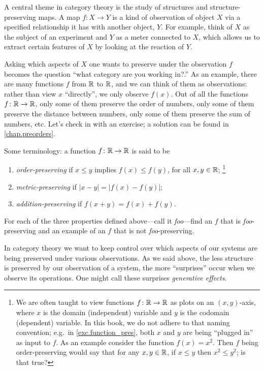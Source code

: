 \documentclass[7Sketches]{subfiles}
\begin{document}
A central theme in category theory is the study of structures and
structure-preserving maps.%
 A map $f\colon X\to Y$ is a kind of observation of object $X$ via a specified relationship it has with another object, $Y$. For example, think of $X$ as the subject of an experiment and $Y$ as a meter connected to $X$, which allows us to extract certain features of $X$ by looking at the reaction of $Y$.

Asking which aspects of $X$ one wants
to preserve under the observation $f$ becomes the question ``what category are you working
in?.'' As an example, there are many functions $f$ from $\mathbb{R}$ to $\mathbb{R}$, and we can think of them as observations: rather than view $x$ ``directly'', we only observe $f(x)$. Out of all the functions $f\colon\mathbb{R}\to\mathbb{R}$, only
some of them preserve the order of numbers, only some of them preserve the distance between numbers, only
some of them preserve the sum of numbers, etc. Let's check in with an exercise; a solution can be found in \cref{chap.preorders}.

\begin{exercise}%
\label{exc.function_pres} %
%
Some terminology: a function $f\colon \mathbb{R}\to\mathbb{R}$ is said to be
\begin{enumerate}[label=(\alph*)]
	\item \emph{order-preserving} if $x\leq y$ implies $f(x)\leq f(y)$, for all $x,y\in\mathbb{R}$;%
	\footnote{We are often taught to view functions $f\colon\mathbb{R}\to\mathbb{R}$ as plots on an $(x,y)$-axis, where $x$ is the domain (independent) variable and $y$ is the codomain (dependent) variable. In this book, we do not adhere to that naming convention; e.g.\ in \cref{exc.function_pres}, both $x$ and $y$ are being ``plugged in'' as input to $f$. As an example consider the function $f(x)=x^2$. Then $f$ being order-preserving would say that for any $x,y\in\mathbb{R}$, if $x\leq y$ then $x^2\leq y^2$; is that true?}
	\item \emph{metric-preserving} if $|x-y|=|f(x)-f(y)|$;
	\item \emph{addition-preserving} if $f(x+y)=f(x)+f(y)$.
\end{enumerate}
For each of the three properties defined above---call it \emph{foo}---find an $f$ that is \emph{foo}-preserving and
an example of an $f$ that is not \emph{foo}-preserving.
\end{exercise}

In category theory we want to keep control over which aspects of our systems are being preserved under various observations. As we said above, the less structure is preserved by our observation of a system, the more ``surprises'' occur when we observe its operations. One might call these surprises \emph{generative effects}.
%
\end{document}
